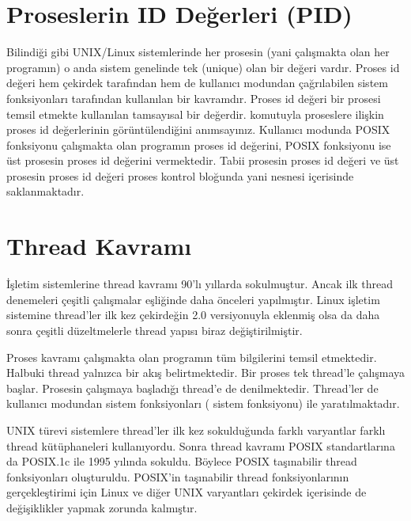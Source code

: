 \documentclass[a4paper,10pt,turkish]{sphinxmanual}
\begin{document}
\section{Proseslerin ID Değerleri (PID)}
\label{\detokenize{processcontrolblock:proseslerin-id-degerleri-pid}}
\sphinxAtStartPar
Bilindiği gibi UNIX/Linux sistemlerinde her prosesin (yani çalışmakta olan her programın) o anda sistem
genelinde tek (unique) olan bir  değeri vardır. Proses id değeri hem çekirdek
tarafından hem de kullanıcı modundan çağrılabilen sistem fonksiyonları tarafından kullanılan bir
kavramdır. Proses id değeri bir prosesi temsil etmekte kullanılan tamsayısal bir değerdir.  komutuyla
proseslere ilişkin proses id değerlerinin görüntülendiğini anımsayınız. Kullanıcı modunda  POSIX
fonksiyonu çalışmakta olan programın proses id değerini,  POSIX fonksiyonu ise üst prosesin
proses id değerini vermektedir. Tabii prosesin proses id değeri ve üst prosesin proses id değeri proses
kontrol bloğunda yani  nesnesi içerisinde saklanmaktadır.


\section{Thread Kavramı}
\label{\detokenize{processcontrolblock:thread-kavrami}}
\sphinxAtStartPar
İşletim sistemlerine thread kavramı 90’lı yıllarda sokulmuştur. Ancak ilk thread denemeleri çeşitli
çalışmalar eşliğinde daha önceleri yapılmıştır. Linux işletim sistemine thread’ler ilk kez çekirdeğin
2.0 versiyonuyla eklenmiş olsa da daha sonra çeşitli düzeltmelerle thread yapısı biraz değiştirilmiştir.

\sphinxAtStartPar
Proses kavramı çalışmakta olan programın tüm bilgilerini temsil etmektedir. Halbuki thread yalnızca bir
akış belirtmektedir. Bir proses tek thread’le çalışmaya başlar. Prosesin çalışmaya başladığı thread’e
 de denilmektedir. Thread’ler de kullanıcı modundan sistem fonksiyonları
( sistem fonksiyonu) ile yaratılmaktadır.

\sphinxAtStartPar
UNIX türevi sistemlere thread’ler ilk kez sokulduğunda farklı varyantlar farklı thread kütüphaneleri
kullanıyordu. Sonra thread kavramı POSIX standartlarına da POSIX.1c ile 1995 yılında sokuldu. Böylece
POSIX taşınabilir thread fonksiyonları oluşturuldu. POSIX’in taşınabilir thread fonksiyonlarının
gerçekleştirimi için Linux ve diğer UNIX varyantları çekirdek içerisinde de değişiklikler yapmak zorunda
kalmıştır.
\end{document}
